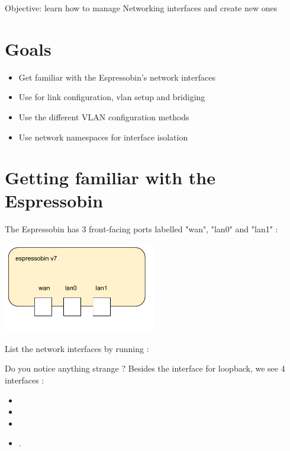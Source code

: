 {Objective: learn how to manage Networking interfaces and create new ones}

\section{Goals}

\begin{itemize}
\item Get familiar with the Espressobin's network interfaces
\item Use  for link configuration, vlan setup and bridiging
\item Use the different VLAN configuration methods
\item Use network namespaces for interface isolation
\end{itemize}

\section{Getting familiar with the Espressobin}

The Espressobin has 3 front-facing ports labelled "wan", "lan0" and "lan1" :

\begin{center}
\includegraphics[width=0.5\textwidth]{labs/networking-stack/01_LAB1_espressobin.pdf}
\end{center}

List the network interfaces by running :


Do you notice anything strange ? Besides the  interface for loopback,
we see 4 interfaces :

\begin{itemize}
\item {}
\item {}
\item {}
\item {}.
\end{itemize}

